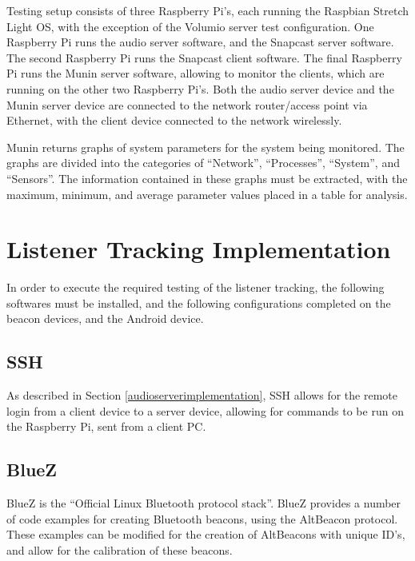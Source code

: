\documentclass[11pt,a4paper,headinclude=false,footinclude=false]{scrreprt}
\begin{document}
Testing setup consists of three Raspberry Pi's, each running the
Raspbian Stretch Light OS, with the exception of the Volumio server test
configuration. One Raspberry Pi runs the audio server software, and the
Snapcast server software. The second Raspberry Pi runs the Snapcast
client software. The final Raspberry Pi runs the Munin server software,
allowing to monitor the clients, which are running on the other two
Raspberry Pi's. Both the audio server device and the Munin server device
are connected to the network router/access point via Ethernet, with the
client device connected to the network wirelessly.

Munin returns graphs of system parameters for the system being
monitored. The graphs are divided into the categories of ``Network'',
``Processes'', ``System'', and ``Sensors''. The information contained in
these graphs must be extracted, with the maximum, minimum, and average
parameter values placed in a table for analysis.

\section{Listener Tracking
Implementation}\label{listener-tracking-implementation}

In order to execute the required testing of the listener tracking, the
following softwares must be installed, and the following configurations
completed on the beacon devices, and the Android device.

\subsection{SSH}\label{ssh-1}

As described in Section \ref{audioserverimplementation}, SSH allows for
the remote login from a client device to a server device, allowing for
commands to be run on the Raspberry Pi, sent from a client PC.

\subsection{BlueZ}\label{bluez}

BlueZ is the ``Official Linux Bluetooth protocol stack''\cite{bluez}.
BlueZ provides a number of code examples for creating Bluetooth beacons,
using the AltBeacon protocol. These examples can be modified for the
creation of AltBeacons with unique ID's, and allow for the calibration
of these beacons.
\end{document}
